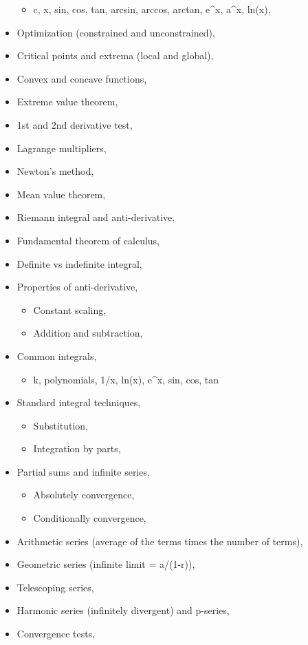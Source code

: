 \begin{itemize}
  \begin{itemize}
  \tightlist
  \item
    c, x, sin, cos, tan, arcsin, arccos, arctan, e\^{}x, a\^{}x, ln(x),
  \end{itemize}
\item
  Optimization (constrained and unconstrained),
\item
  Critical points and extrema (local and global),
\item
  Convex and concave functions,
\item
  Extreme value theorem,
\item
  1st and 2nd derivative test,
\item
  Lagrange multipliers,
\item
  Newton's method,
\item
  Mean value theorem,
\item
  Riemann integral and anti-derivative,
\item
  Fundamental theorem of calculus,
\item
  Definite vs indefinite integral,
\item
  Properties of anti-derivative,

  \begin{itemize}
  \tightlist
  \item
    Constant scaling,
  \item
    Addition and subtraction,
  \end{itemize}
\item
  Common integrals,

  \begin{itemize}
  \tightlist
  \item
    k, polynomials, 1/x, ln(x), e\^{}x, sin, cos, tan
  \end{itemize}
\item
  Standard integral techniques,

  \begin{itemize}
  \tightlist
  \item
    Substitution,
  \item
    Integration by parts,
  \end{itemize}
\item
  Partial sums and infinite series,

  \begin{itemize}
  \tightlist
  \item
    Absolutely convergence,
  \item
    Conditionally convergence,
  \end{itemize}
\item
  Arithmetic series (average of the terms times the number of terms),
\item
  Geometric series (infinite limit = a/(1-r)),
\item
  Telescoping series,
\item
  Harmonic series (infinitely divergent) and p-series,
\item
  Convergence tests,


\end{itemize}
